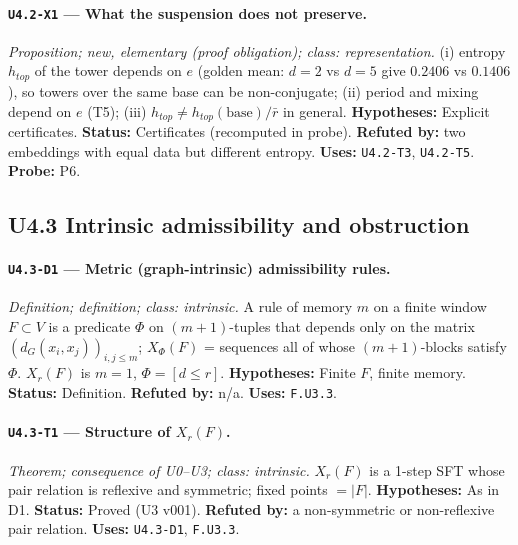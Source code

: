 \documentclass[11pt]{article}
\begin{document}
\paragraph{\texttt{U4.2-X1} --- What the suspension does not preserve.} \emph{Proposition; new, elementary (proof obligation); class: representation.} (i) entropy $h_{top}$ of the tower depends on $e$ (golden mean: $d=2$ vs $d=5$ give $0.2406$ vs $0.1406$), so towers over the same base can be non-conjugate; (ii) period and mixing depend on $e$ (T5); (iii) $h_{top}\neq h_{top}(\text{base})/\bar r$ in general. \textbf{Hypotheses:} Explicit certificates. \textbf{Status:} Certificates (recomputed in probe). \textbf{Refuted by:} two embeddings with equal data but different entropy. \textbf{Uses:} \texttt{U4.2-T3}, \texttt{U4.2-T5}. \textbf{Probe:} P6.

\subsection{U4.3 Intrinsic admissibility and obstruction}
\paragraph{\texttt{U4.3-D1} --- Metric (graph-intrinsic) admissibility rules.} \emph{Definition; definition; class: intrinsic.} A rule of memory $m$ on a finite window $F\subset V$ is a predicate $\Phi$ on $(m{+}1)$-tuples that depends only on the matrix $(d_G(x_i,x_j))_{i,j\le m}$; $X_\Phi(F)$ = sequences all of whose $(m{+}1)$-blocks satisfy $\Phi$. $X_r(F)$ is $m=1$, $\Phi=[d\le r]$. \textbf{Hypotheses:} Finite $F$, finite memory. \textbf{Status:} Definition. \textbf{Refuted by:} n/a. \textbf{Uses:} \texttt{F.U3.3}.

\paragraph{\texttt{U4.3-T1} --- Structure of $X_r(F)$.} \emph{Theorem; consequence of U0--U3; class: intrinsic.} $X_r(F)$ is a 1-step SFT whose pair relation is reflexive and symmetric; fixed points $=|F|$. \textbf{Hypotheses:} As in D1. \textbf{Status:} Proved (U3 v001). \textbf{Refuted by:} a non-symmetric or non-reflexive pair relation. \textbf{Uses:} \texttt{U4.3-D1}, \texttt{F.U3.3}.
\end{document}
